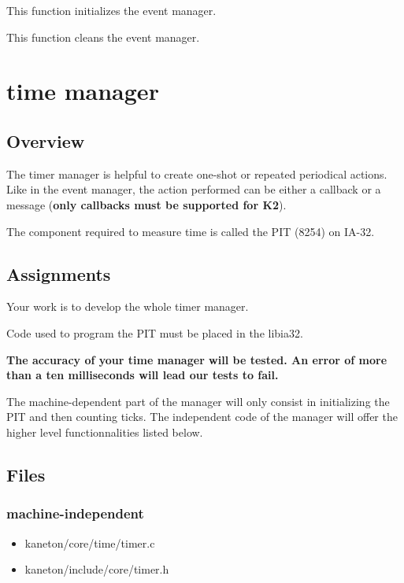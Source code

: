 	 {
	   This function initializes the event manager.
	 }

	 {
	   This function cleans the event manager.
	 }


%
%

\newpage

\section{time manager}
\subsection*{Overview}

The timer manager is helpful to create one-shot or repeated
periodical actions. Like in the event manager, the action
performed can be either a callback or a message (\textbf{only
  callbacks must be supported for K2}).

The component required to measure time is called the PIT (8254) on
IA-32.

\subsection*{Assignments}

Your work is to develop the whole timer manager.

Code used to program the PIT must be placed in the libia32.

\textbf{The accuracy of your time manager will be tested. An error
  of more than a ten milliseconds will lead our tests to fail.}

The machine-dependent part of the manager will only consist in
initializing the PIT and then counting ticks. The independent code
of the manager will offer the higher level functionnalities listed
below.

\subsection*{Files}
\subsubsection{\color{filerefcolor} machine-independent}
\begin{itemize}
\item kaneton/core/time/timer.c
\item kaneton/include/core/timer.h
\end{itemize}

